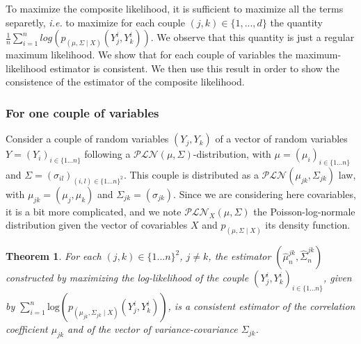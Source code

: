 \documentclass[11pt, a4paper]{article}
\newtheorem{theorem}{Theorem}
\begin{document}
To maximize the composite likelihood, it is sufficient to maximize all the terms separetly, \textit{i.e.} to maximize for each couple $(j,k) \in \{1,...,d\}$ the quantity $\frac{1}{n} \sum_{i=1}^{n} log(p_{(\mu,\Sigma \mid X)} (Y^i_j,Y^i_k))$. We observe that this quantity is just a regular maximum likelihood. We show that for each couple of variables the maximum-likelihood estimator is consistent. We then use this result in order to show the consistence of the estimator of the composite likelihood.

\begin{comment}
 We will now follow the following path : first we will show that for one couple $(j,k)$ we do estimate the exact parameters. This consists in showing that the considered quantity converge in probability to a function of the parameters, then showing that the model is identifiable and finely showing that, in our case, the maximum likelihood function only have one maximum wich will be our estimator. Once we shew that for one couple, we will use this in order to estimate the composite-maximum-likelihood estimator. We will have to show again the convergence in probability and the identifiability. To find the composite-maximum-likelihood estimator we will maximize component by component and thus construct the maximum likelihood estimator.
\end{comment} 
 

\subsubsection{For one couple of variables} 

Consider a couple of random variables $(Y_j,Y_k)$ of a vector of random variables $Y=(Y_i)_{i \in \{1...n\}}$ following a $\mathcal{PLN}(\mu,\Sigma)$-distribution, with $\mu=(\mu_{i})_{i \in \{1...n\}}$ and $\Sigma= (\sigma_{il})_{(i,l) \in \{1...n\}^2}$. This couple is distributed as a $\mathcal{PLN}(\mu_{jk},\Sigma_{jk})$ law, with $\mu_{jk}=(\mu_j,\mu_k)$ and $\Sigma_{jk}=(\sigma_{jk})$. Since we are considering here covariables, it is a bit more complicated, and we note $\mathcal{PLN}_X(\mu,\Sigma)$ the Poisson-log-normale distribution given the vector of covariables $X$ and $p_(\mu, \Sigma \mid X)$ its density function.

\begin{theorem} \label{Consistence_2}
For each $(j,k) \in \{1...n\}^2$, $j \neq k$, the estimator $(\widehat{\mu}^{jk}_n,\widehat{\Sigma}^{jk}_n)$ constructed by maximizing the log-likelihood of the couple $(Y^i_j,Y^i_k)_{i \in \{1...n\}}$, given by $\sum_{i=1}^{n} \mathrm{log}(p_{(\mu_{jk},\Sigma_{jk} \mid X)}(Y^i_j,Y^i_k))$, is a consistent estimator of the correlation coefficient $\mu_{jk}$ and of the vector of variance-covariance $\Sigma_{jk}$.
\end{theorem}
\end{document}
